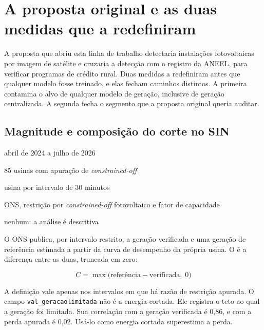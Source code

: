 \chapter{A proposta original e as duas medidas que a redefiniram}
\label{cap:ancora}

A proposta que abriu esta linha de trabalho detectaria instalações
fotovoltaicas por imagem de satélite e cruzaria a detecção com o registro da
ANEEL, para verificar programas de crédito rural. Duas medidas a redefiniram
antes que qualquer modelo fosse treinado, e elas fecham caminhos distintos. A
primeira contamina o alvo de qualquer modelo de geração, inclusive de geração
centralizada. A segunda fecha o segmento que a proposta original queria
auditar.

\section{Magnitude e composição do corte no SIN}
\label{sec:fig1}

\begin{ficha}
  \item[Janela]      abril de 2024 a julho de 2026
  \item[Amostra]     85 usinas com apuração de \textit{constrained-off}
  \item[Unidade]     usina por intervalo de 30 minutos
  \item[Fonte]       ONS, restrição por \textit{constrained-off} fotovoltaico
                     e fator de capacidade
  \item[Teste]       nenhum: a análise é descritiva
\end{ficha}

O ONS publica, por intervalo restrito, a geração verificada e uma geração de
referência estimada a partir da curva de desempenho da própria usina. O
 é a diferença entre as duas, truncada em zero:

\[ C = \max\bigl(\text{referência} - \text{verificada},\; 0\bigr) \]

A definição vale apenas nos intervalos em que há razão de restrição apurada. O
campo \texttt{val\_\allowbreak geracaolimitada} não é a energia cortada. Ele registra o teto
ao qual a geração foi limitada. Sua correlação com a geração verificada é 0,86,
e com a perda apurada é 0,02. Usá-lo como energia cortada superestima a perda.

